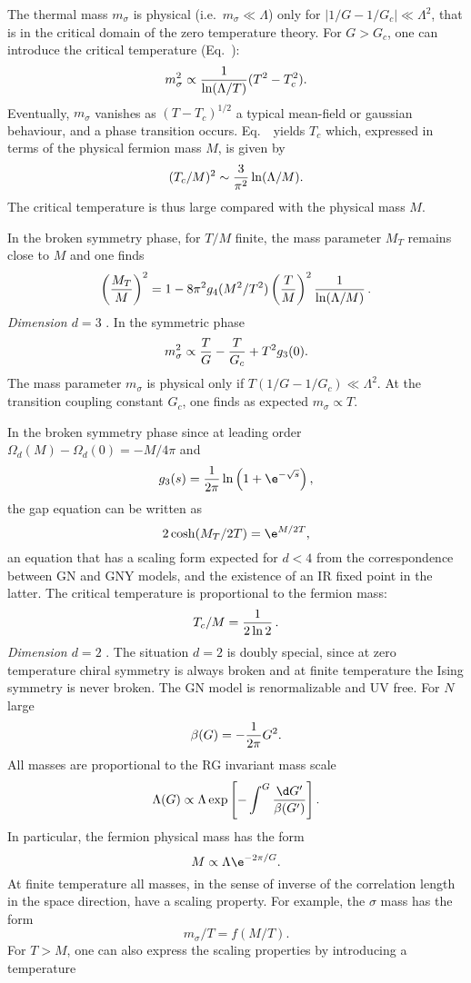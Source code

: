 The thermal  mass $m_\sigma $ is physical (i.e.~$m_\sigma \ll \Lambda $) only  for $|1/G-1/G_c|\ll \Lambda
^2$, that is in the critical domain of the zero temperature theory.
For $G>G_c$, one can introduce the critical temperature (Eq.~\eGNNTTc):
$$m_\sigma^2 \propto {1\over \ln(\Lambda /T)}(T^2-T_c^2).$$
Eventually, $m_\sigma $ vanishes as $(T-T_c)^{1/2}$ a typical mean-field or gaussian behaviour, and a
phase transition occurs.  Eq.~\eGNNTTc\ yields $T_c$ which,  expressed in terms of the
physical fermion mass $M $,  is given by
$$(T_c/M)^2\sim {3\over \pi^2}\ln(\Lambda /M).$$
The critical temperature is thus large compared with the
physical mass $M$.  \par
In the broken symmetry phase, for $T/M$ finite, the mass parameter $M_T$ remains
close to $M$
and one finds
$$\left(M_T\over M\right)^2=1- 8\pi^2  g_4(M^2/T^2)\left(T\over M\right)^2{1\over \ln (\Lambda /M)}\,.$$
\medskip
{\it Dimension $d=3$} . In the symmetric phase
$$m_\sigma ^2\propto   {T \over  G} -{T\over G_c}+  T^2 g_3(0) . $$
The mass parameter $m_\sigma $ is physical only if $T(1/G-1/G_c)\ll \Lambda ^2$. At
the transition coupling constant
$G_c$, one finds as expected $m_\sigma \propto T$. \par
In the broken symmetry phase since at leading order $\Omega_d(M)-\Omega_d(0)=-M/4\pi$ and
$$g_3(s)={1\over 2\pi}\ln\left(1+\e^{-\sqrt{s}}\right),$$
the gap equation can be written as
$$2\cosh(M_T/2T)=\e^{M/2T},$$
an equation that has a scaling form expected for $d<4$ from the correspondence between GN and GNY models, and the existence
of an IR fixed point in the latter.
The critical temperature  is proportional to the fermion mass:
$$T_c/M={1\over 2\ln2}\,.$$
\medskip
{\it Dimension $d=2$} . The situation $d=2$ is doubly special, since at zero temperature chiral
symmetry is always broken and at finite temperature the Ising symmetry is
never broken.  The GN model is renormalizable and UV free. For $N$ large
$$\beta(G)=-{1  \over 2\pi}G^2 . $$
All masses are  proportional to the RG invariant mass scale
$$\Lambda(G) \propto\Lambda \exp\left[-\int^G{\d G'\over \beta (G')}\right] .
$$
In particular, the fermion physical mass   has the form
$$M\propto \Lambda \e^{-2\pi/G}. $$
At finite temperature all masses, in the sense of inverse of the correlation length in the space direction, have a scaling property. For example, the
$\sigma $ mass has the form
$$m_\sigma/T=f(M/T). $$
For $T>M$, one can also express the scaling properties by introducing a temperature
